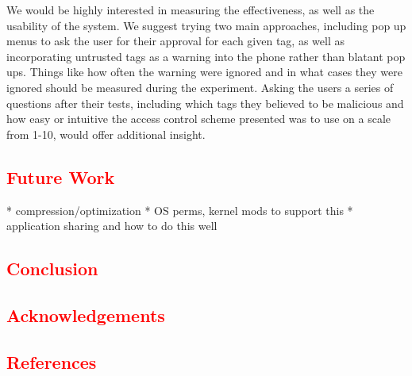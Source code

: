 \documentclass[12pt]{article}
\newcommand\TODO[1]{\textcolor{red}{#1}}
\begin{document}
We would be highly interested in measuring the effectiveness, as well as the usability of the system. We suggest trying two main approaches, including pop up menus to ask the user for their approval for each given tag, as well as incorporating untrusted tags as a warning into the phone rather than blatant pop ups. Things like how often the warning were ignored and in what cases they were ignored should be measured during the experiment. Asking the users a series of questions after their tests, including which tags they believed to be malicious and how easy or intuitive the access control scheme presented was to use on a scale from 1-10, would offer additional insight. 

\TODO{\section{Future Work}}
* compression/optimization
* OS perms, kernel mods to support this
* application sharing and how to do this well

\TODO{\section{Conclusion}}

\TODO{\section{Acknowledgements}}

\TODO{\section{References}}



\end{document}

